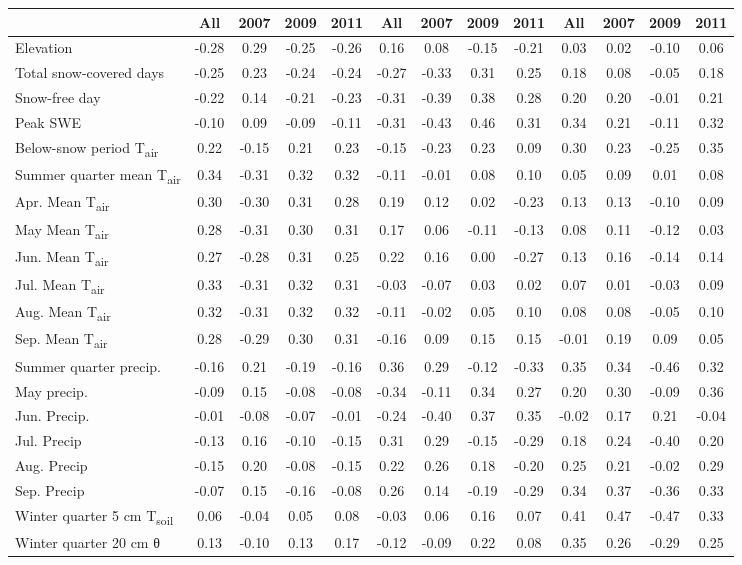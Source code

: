 \begin{sidewaystable}
\begin{tabular}{lcccccccccccc}
\cmidrule(l){2-5} \cmidrule(l){6-9} \cmidrule(l){10-13}
{} &All	&2007 &2009 &2011 &All &2007 &2009 &2011 &All &2007 &2009 &2011\\
\midrule
Elevation	&-0.28	&0.29	&-0.25	&-0.26	&0.16	&0.08	&-0.15	&-0.21	&0.03	&0.02	&-0.10	&0.06\\
Total snow-covered days	&-0.25	&0.23	&-0.24	&-0.24	&-0.27	&-0.33	&0.31	&0.25	&0.18	&0.08	&-0.05	&0.18\\
Snow-free day	&-0.22	&0.14	&-0.21	&-0.23	&-0.31	&-0.39	&0.38	&0.28	&0.20	&0.20	&-0.01	&0.21\\
Peak SWE	&-0.10	&0.09	&-0.09	&-0.11	&-0.31	&-0.43	&0.46	&0.31	&0.34	&0.21	&-0.11	&0.32\\
Below-snow period T\textsubscript{air}	&0.22	&-0.15	&0.21	&0.23	&-0.15	&-0.23	&0.23	&0.09	&0.30	&0.23	&-0.25	&0.35\\
Summer quarter mean T\textsubscript{air}	&0.34	&-0.31	&0.32	&0.32	&-0.11	&-0.01	&0.08	&0.10	&0.05	&0.09	&0.01	&0.08\\
Apr. Mean T\textsubscript{air}	&0.30	&-0.30	&0.31	&0.28	&0.19	&0.12	&0.02	&-0.23	&0.13	&0.13	&-0.10	&0.09\\
May Mean T\textsubscript{air}	&0.28	&-0.31	&0.30	&0.31	&0.17	&0.06	&-0.11	&-0.13	&0.08	&0.11	&-0.12	&0.03\\
Jun. Mean T\textsubscript{air}	&0.27	&-0.28	&0.31	&0.25	&0.22	&0.16	&0.00	&-0.27	&0.13	&0.16	&-0.14	&0.14\\
Jul. Mean T\textsubscript{air}	&0.33	&-0.31	&0.32	&0.31	&-0.03	&-0.07	&0.03	&0.02	&0.07	&0.01	&-0.03	&0.09\\
Aug. Mean T\textsubscript{air}	&0.32	&-0.31	&0.32	&0.32	&-0.11	&-0.02	&0.05	&0.10	&0.08	&0.08	&-0.05	&0.10\\
Sep. Mean T\textsubscript{air}	&0.28	&-0.29	&0.30	&0.31	&-0.16	&0.09	&0.15	&0.15	&-0.01	&0.19	&0.09	&0.05\\
Summer quarter precip.	&-0.16	&0.21	&-0.19	&-0.16	&0.36	&0.29	&-0.12	&-0.33	&0.35	&0.34	&-0.46	&0.32\\
May precip.	&-0.09	&0.15	&-0.08	&-0.08	&-0.34	&-0.11	&0.34	&0.27	&0.20	&0.30	&-0.09	&0.36\\
Jun. Precip.	&-0.01	&-0.08	&-0.07	&-0.01	&-0.24	&-0.40	&0.37	&0.35	&-0.02	&0.17	&0.21	&-0.04\\
Jul. Precip	&-0.13	&0.16	&-0.10	&-0.15	&0.31	&0.29	&-0.15	&-0.29	&0.18	&0.24	&-0.40	&0.20\\
Aug. Precip	&-0.15	&0.20	&-0.08	&-0.15	&0.22	&0.26	&0.18	&-0.20	&0.25	&0.21	&-0.02	&0.29\\
Sep. Precip	&-0.07	&0.15	&-0.16	&-0.08	&0.26	&0.14	&-0.19	&-0.29	&0.34	&0.37	&-0.36	&0.33\\
Winter quarter 5 cm T\textsubscript{soil}	&0.06	&-0.04	&0.05	&0.08	&-0.03	&0.06	&0.16	&0.07	&0.41	&0.47	&-0.47	&0.33\\
Winter quarter 20 cm θ	&0.13	&-0.10	&0.13	&0.17	&-0.12	&-0.09	&0.22	&0.08	&0.35	&0.26	&-0.29	&0.25\\
\bottomrule
\end{tabular}

\end{sidewaystable}
